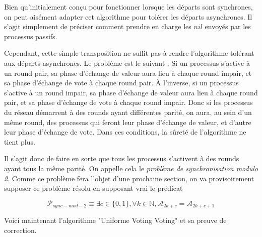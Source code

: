 \documentclass{article}
\begin{document}
Bien qu'initialement conçu pour fonctionner lorsque les départs sont synchrones, on peut aisément adapter cet algorithme pour tolérer les départs asynchrones.
Il s'agit simplement de préciser comment prendre en charge les $nil$ envoyés par les processus passifs.

Cependant, cette simple transposition ne suffit pas à rendre l'algorithme tolérant aux départs asynchrones. Le problème est le suivant :
Si un processus s'active à un round pair, sa phase d'échange de valeur aura lieu à chaque round impair, et sa phase d'échange de vote à chaque round pair.
À l'inverse,
si un processus s'active à un round impair, sa phase d'échange de valeur aura lieu à chaque round pair, et sa phase d'échange de vote à chaque round impair.
Donc si les processus du réseau démarrent à des rounds ayant différentes parité, on aura, au sein d'un même round,
des processus qui feront leur phase d'échange de valeur, et d'autre leur phase d'échange de vote.
Dans ces conditions, la sûreté de l'algorithme ne tient plus.

Il s'agit donc de faire en sorte que tous les processus s'activent à des rounds ayant tous la même parité. 
On appelle cela le \emph{problème de synchronisation modulo 2}.
Comme ce problème fera l'objet d'une prochaine section, on va provisoirement supposer ce problème résolu en supposant vrai le prédicat 

$$\mathcal{P}_{sync-mod-2} \equiv \exists c \in \{0, 1\}, \forall k \in \mathds{N}, \mathcal{A}_{2k+c} = \mathcal{A}_{2k+c+1}$$

Voici maintenant l'algorithme "Uniforme Voting	Voting" et sa preuve de correction.
\end{document}
